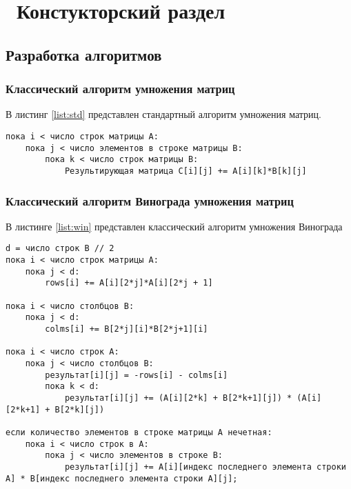 \chapter{ Констукторский раздел}
\label{cha:design}
\section{ Разработка алгоритмов}

\subsection{ Классический алгоритм умножения матриц}
В листинг \ref{list:std} представлен стандартный алгоритм умножения матриц.

\begin{lstlisting}[caption={Псевдокод стандартного алгоритма умножения матриц.}, label={list:std}]
пока i < число строк матрицы А:
	пока j < число элементов в строке матрицы B:
        пока k < число строк матрицы B:
		    Результирующая матрица C[i][j] += A[i][k]*B[k][j]
\end{lstlisting}	



\subsection{ Классический алгоритм Винограда умножения матриц}
В листинге \ref{list:win} представлен классический алгоритм умножения Винограда

\begin{lstlisting}[caption={Псевдокод алгоритма умножения матриц Винограда.}, label={list:win}]
d = число строк B // 2
пока i < число строк матрицы А:
	пока j < d:
		rows[i] += A[i][2*j]*A[i][2*j + 1]

пока i < число столбцов B:
	пока j < d:
		colms[i] += B[2*j][i]*B[2*j+1][i]

пока i < число строк A:
	пока j < число cтолбцов B:
        результат[i][j] = -rows[i] - colms[i]
        пока k < d:
            результат[i][j] += (A[i][2*k] + B[2*k+1][j]) * (A[i][2*k+1] + B[2*k][j])

если количество элементов в строке матрицы A нечетная:
    пока i < число строк в A:
        пока j < число элементов в строке B:
            результат[i][j] += A[i][индекс последнего элемента строки A] * B[индекс последнего элемента строки A][j];
\end{lstlisting}	




